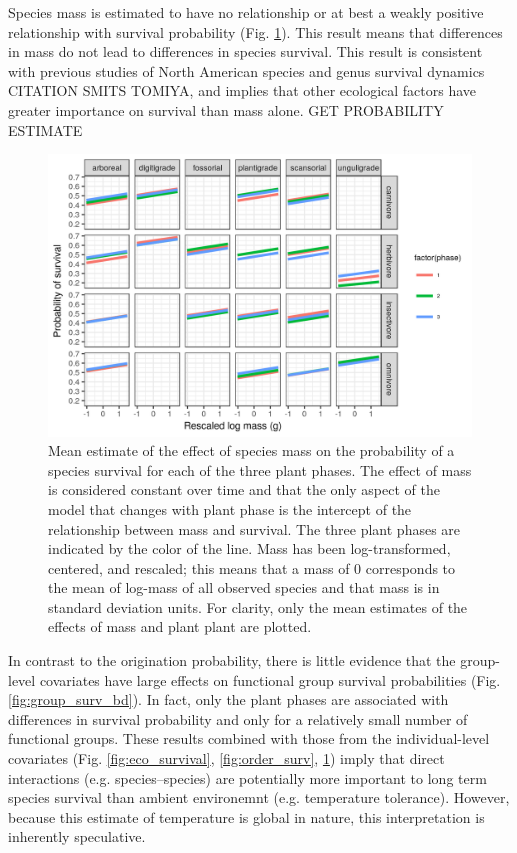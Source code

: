 \documentclass[12pt,letterpaper]{article}
\begin{document}
Species mass is estimated to have no relationship or at best a weakly positive relationship with survival probability (Fig. \ref{fig:mass_survival}). This result means that differences in mass do not lead to differences in species survival. This result is consistent with previous studies of North American species and genus survival dynamics CITATION SMITS TOMIYA, and implies that other ecological factors have greater importance on survival than mass alone. \uppercase{get probability estimate}
\begin{figure}[ht]
  \centering
  \includegraphics[width=\textwidth,height=0.4\textheight,keepaspectratio=true]{figure/mass_on_surv_bd}
  \caption[Effect of mass on probability of species survival as estimated from the birth-death model]{Mean estimate of the effect of species mass on the probability of a species survival for each of the three plant phases. The effect of mass is considered constant over time and that the only aspect of the model that changes with plant phase is the intercept of the relationship between mass and survival. The three plant phases are indicated by the color of the line. Mass has been log-transformed, centered, and rescaled; this means that a mass of 0 corresponds to the mean of log-mass of all observed species and that mass is in standard deviation units. For clarity, only the mean estimates of the effects of mass and plant plant are plotted.}
  \label{fig:mass_survival}
\end{figure}

In contrast to the origination probability, there is little evidence that the group-level covariates have large effects on functional group survival probabilities (Fig. \ref{fig:group_surv_bd}). In fact, only the plant phases are associated with differences in survival probability and only for a relatively small number of functional groups. These results combined with those from the individual-level covariates (Fig. \ref{fig:eco_survival}, \ref{fig:order_surv}, \ref{fig:mass_survival}) imply that direct interactions (e.g. species--species) are potentially more important to long term species survival than ambient environemnt (e.g. temperature tolerance). However, because this estimate of temperature is global in nature, this interpretation is inherently speculative.
\end{document}
